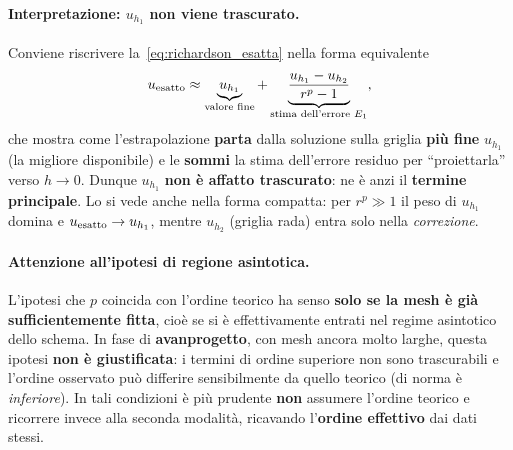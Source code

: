\paragraph{Interpretazione: $u_{h_1}$ non viene trascurato.}
Conviene riscrivere la~\eqref{eq:richardson_esatta} nella forma equivalente
\begin{equation}
  u_{\rm esatto} \approx \underbrace{u_{h_1}}_{\text{valore fine}}
  + \underbrace{\frac{u_{h_1}-u_{h_2}}{r^p-1}}_{\text{stima dell'errore } E_1},
\end{equation}
che mostra come l'estrapolazione \textbf{parta} dalla soluzione sulla griglia \textbf{più fine}
$u_{h_1}$ (la migliore disponibile) e le \textbf{sommi} la stima dell'errore residuo per
``proiettarla'' verso $h\to0$. Dunque $u_{h_1}$ \textbf{non è affatto trascurato}: ne è anzi il
\textbf{termine principale}. Lo si vede anche nella forma compatta: per $r^p\gg1$ il peso di
$u_{h_1}$ domina e $u_{\rm esatto}\to u_{h_1}$, mentre $u_{h_2}$ (griglia rada) entra solo nella
\emph{correzione}.

\paragraph{Attenzione all'ipotesi di regione asintotica.}
L'ipotesi che $p$ coincida con l'ordine teorico ha senso \textbf{solo se la mesh è già
sufficientemente fitta}, cioè se si è effettivamente entrati nel regime asintotico dello
schema. In fase di \textbf{avanprogetto}, con mesh ancora molto larghe, questa ipotesi
\textbf{non è giustificata}: i termini di ordine superiore non sono trascurabili e
l'ordine osservato può differire sensibilmente da quello teorico (di norma è
\emph{inferiore}). In tali condizioni è più prudente \textbf{non} assumere l'ordine
teorico e ricorrere invece alla seconda modalità, ricavando l'\textbf{ordine effettivo}
dai dati stessi.


